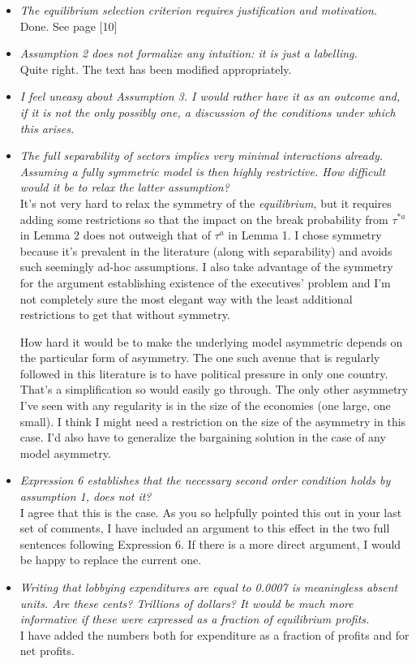 \documentclass[12pt]{report}
\begin{document}
\begin{itemize}
  \item \textit{The equilibrium selection criterion requires justification and motivation.} \\
	Done. See page [10]
	
  \item \textit{Assumption 2 does not formalize any intuition: it is just a labelling.} \\
	Quite right. The text has been modified appropriately.
  \item \textit{I feel uneasy about Assumption 3. I would rather have it as an outcome and, if it is not the only possibly one, a discussion of the conditions under which this arises.}
  \item \textit{The full separability of sectors implies very minimal interactions already. Assuming a fully symmetric model is then highly restrictive. How difficult would it be to relax the latter assumption?} \\
	It's not very hard to relax the symmetry of the \textit{equilibrium}, but it requires adding some restrictions so that the impact on the break probability from $\tau^{*a}$ in Lemma 2 does not outweigh that of $\tau^a$ in Lemma 1. I chose symmetry because it's prevalent in the literature (along with separability) and avoids such seemingly ad-hoc assumptions. I also take advantage of the symmetry for the argument establishing existence of the executives' problem and I'm not completely sure the most elegant way with the least additional restrictions to get that without symmetry.
	
	How hard it would be to make the underlying model asymmetric depends on the particular form of asymmetry. The one such avenue that is regularly followed in this literature is to have political pressure in only one country. That's a simplification so would easily go through. The only other asymmetry I've seen with any regularity is in the size of the economies (one large, one small). I think I might need a restriction on the size of the asymmetry in this case. I'd also have to generalize the bargaining solution in the case of any model asymmetry.
	
  \item \textit{Expression 6 establishes that the necessary second order condition holds by assumption 1, does not it?} \\
	I agree that this is the case. As you so helpfully pointed this out in your last set of comments, I have included an argument to this effect in the two full sentences following Expression 6. If there is a more direct argument, I would be happy to replace the current one.
  \item \textit{Writing that lobbying expenditures are equal to 0.0007 is meaningless absent units. Are these cents? Trillions of dollars? It would be much more informative if these were expressed as a fraction of equilibrium profits.} \\
	I have added the numbers both for expenditure as a fraction of profits and for net profits.
	

\end{itemize}
\end{document}
